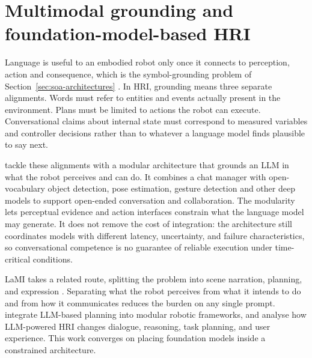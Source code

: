 \section[Multimodal grounding and foundation-model-based HRI]{Multimodal grounding and\\foundation-model-based HRI}
\label{sec:multimodal-grounding}

Language is useful to an embodied robot only once it connects to perception, action and consequence, which is the symbol-grounding problem of Section~\ref{sec:soa-architectures} \citep{Harnad1990SymbolGrounding}. In HRI, grounding means three separate alignments. Words must refer to entities and events actually present in the environment. Plans must be limited to actions the robot can execute. Conversational claims about internal state must correspond to measured variables and controller decisions rather than to whatever a language model finds plausible to say next.

\citet{Allgeuer2024Chatty} tackle these alignments with a modular architecture that grounds an LLM in what the robot perceives and can do. It combines a chat manager with open-vocabulary object detection, pose estimation, gesture detection and other deep models to support open-ended conversation and collaboration. The modularity lets perceptual evidence and action interfaces constrain what the language model may generate. It does not remove the cost of integration: the architecture still coordinates models with different latency, uncertainty, and failure characteristics, so conversational competence is no guarantee of reliable execution under time-critical conditions.

LaMI takes a related route, splitting the problem into scene narration, planning, and expression \citep{Wang2024LaMI}. Separating what the robot perceives from what it intends to do and from how it communicates reduces the burden on any single prompt. \citet{Kim2026Streamlining} integrate LLM-based planning into modular robotic frameworks, and \citet{Kim2024LLMHRI} analyse how LLM-powered HRI changes dialogue, reasoning, task planning, and user experience. This work converges on placing foundation models inside a constrained architecture.

